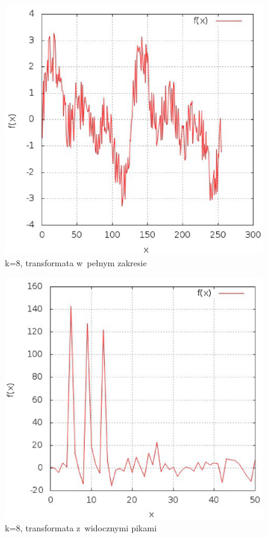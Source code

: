 \documentclass[12pt,a4paper]{article}
\begin{document}
\begin{enumerate}
\begin{figure}
\end{figure}
\begin{figure}
\caption{k=8, transformata w~pełnym zakresie}
\includegraphics{k_8_1.eps}
\end{figure}
\begin{figure}
\caption{k=8, transformata z~widocznymi pikami}
\includegraphics{k_8_2.eps}

\end{figure}
\end{enumerate}
\end{document}
